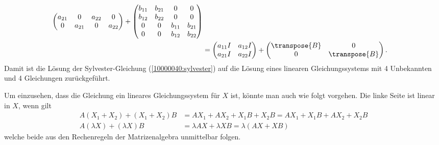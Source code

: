 \begin{loesung}
\begin{align}
\begin{pmatrix}
a_{21}&     0&a_{22}&     0\\
     0&a_{21}&     0&a_{22}
\end{pmatrix}
+
\begin{pmatrix}
b_{11}&b_{21}&     0&     0\\
b_{12}&b_{22}&     0&     0\\
     0&     0&b_{11}&b_{21}\\
     0&     0&b_{12}&b_{22}
\end{pmatrix}
\notag
\\
&=
\begin{pmatrix}
a_{11}I&a_{12}I\\
a_{21}I&a_{22}I
\end{pmatrix}
+
\begin{pmatrix}
\transpose{B}&0\\
0&\transpose{B}
\end{pmatrix}.
\label{10000040:matrix}
\end{align}
Damit ist die Lösung der Sylvester-Gleichung (\ref{10000040:sylvester}) auf 
die Lösung eines linearen Gleichungssystems mit 4 Unbekannten und 4 Gleichungen
zurückgeführt.

Um einzusehen, dass die Gleichung ein lineares Gleichungssystem für $X$ ist,
könnte man auch wie folgt vorgehen.
Die linke Seite ist linear in $X$, wenn gilt
\begin{align*}
A(X_1+X_2)+(X_1+X_2)B&=AX_1+AX_2+X_1B+X_2B=AX_1+X_1B + AX_2+X_2B\\
A(\lambda X)+(\lambda X)B&=\lambda AX+\lambda XB=\lambda(AX+XB)
\end{align*}
welche beide aus den Rechenregeln der Matrizenalgebra unmittelbar folgen.
\end{loesung}

